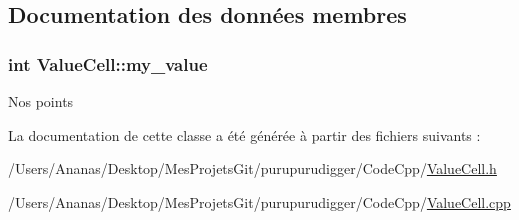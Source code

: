\subsection{Documentation des données membres}
\hypertarget{class_value_cell_a630739966000f7611688a725bdea7d16}{
\subsubsection[{my\-\_\-value}]{\setlength{\rightskip}{0pt plus 5cm}int Value\-Cell\-::my\-\_\-value\hspace{0.3cm}{\ttfamily [protected]}}}\label{class_value_cell_a630739966000f7611688a725bdea7d16}
Nos points 

La documentation de cette classe a été générée à partir des fichiers suivants \-:\begin{DoxyCompactItemize}
\item 
/\-Users/\-Ananas/\-Desktop/\-Mes\-Projets\-Git/purupurudigger/\-Code\-Cpp/\hyperlink{_value_cell_8h}{Value\-Cell.\-h}\item 
/\-Users/\-Ananas/\-Desktop/\-Mes\-Projets\-Git/purupurudigger/\-Code\-Cpp/\hyperlink{_value_cell_8cpp}{Value\-Cell.\-cpp}\end{DoxyCompactItemize}
